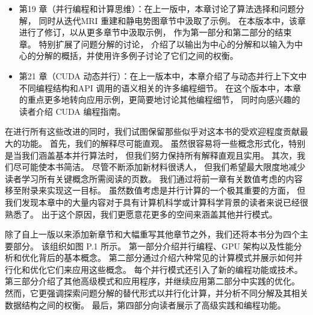 \begin{itemize}
	\item 第19 章（并行编程和计算思维）：在上一版中，本章讨论了算法选择和问题分解，
		同时从迭代MRI 重建和静电势图章节中汲取了示例。 在本版本中，该章进行了修订，以从更多章节中汲取示例，
		作为第一部分和第二部分的结束章。 特别扩展了问题分解的讨论，
		介绍了以输出为中心的分解和以输入为中心的分解的概括，并使用许多例子讨论了它们之间的权衡。

	\item 第21 章（CUDA 动态并行）：在上一版本中，本章介绍了与动态并行上下文中不同编程结构和API 
		调用的语义相关的许多编程细节。 在这个版本中，本章的重点更多地转向应用示例，更简要地讨论其他编程细节，
		同时向感兴趣的读者介绍 CUDA 编程指南。
\end{itemize}

在进行所有这些改进的同时，我们试图保留那些似乎对这本书的受欢迎程度贡献最大的功能。 
首先，我们的解释尽可能直观。 虽然很容易将一些概念形式化，特别是当我们涵盖基本并行算法时，
但我们努力保持所有解释直观且实用。 其次，我们尽可能使本书简洁。 尽管不断添加新材料很诱人，
但我们希望最大限度地减少读者学习所有关键概念所需阅读的页数。 我们通过将前一章有关数值考虑的内容移至附录来实现这一目标。 
虽然数值考虑是并行计算的一个极其重要的方面，
但我们发现本章中的大量内容对于具有计算机科学或计算科学背景的读者来说已经很熟悉了。 
出于这个原因，我们更愿意花更多的空间来涵盖其他并行模式。

除了自上一版以来添加新章节和大幅重写其他章节之外，我们还将本书分为四个主要部分。 
该组织如图 P.1 所示。 第一部分介绍并行编程、GPU 架构以及性能分析和优化背后的基本概念。 
第二部分通过介绍六种常见的计算模式并展示如何并行化和优化它们来应用这些概念。 
每个并行模式还引入了新的编程功能或技术。 第三部分介绍了其他高级模式和应用程序，并继续应用第二部分中实践的优化。 
然而，它更强调探索问题分解的替代形式以并行化计算，并分析不同分解及其相关数据结构之间的权衡。 
最后，第四部分向读者展示了高级实践和编程功能。

